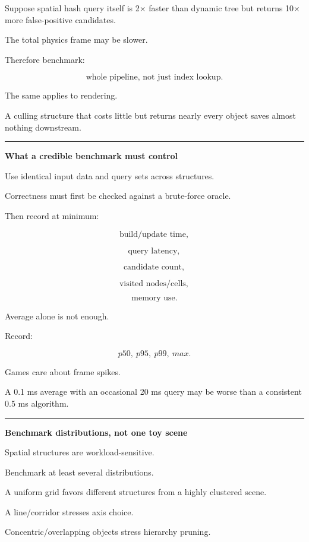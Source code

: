 Suppose spatial hash query itself is 2× faster than dynamic tree but returns 10× more false-positive candidates.

The total physics frame may be slower.

Therefore benchmark:

\[
\boxed{
\text{whole pipeline, not just index lookup}.
}
\]

The same applies to rendering.

A culling structure that costs little but returns nearly every object saves almost nothing downstream.

\begin{center}\rule{0.5\linewidth}{0.5pt}\end{center}

\textbf{What a credible benchmark must control}

Use identical input data and query sets across structures.

Correctness must first be checked against a brute-force oracle.

Then record at minimum:

\[
\text{build/update time},
\]

\[
\text{query latency},
\]

\[
\text{candidate count},
\]

\[
\text{visited nodes/cells},
\]

\[
\text{memory use}.
\]

Average alone is not enough.

Record:

\[
p50,\ p95,\ p99,\ max.
\]

Games care about frame spikes.

A 0.1 ms average with an occasional 20 ms query may be worse than a consistent 0.5 ms algorithm.

\begin{center}\rule{0.5\linewidth}{0.5pt}\end{center}

\textbf{Benchmark distributions, not one toy scene}

Spatial structures are workload-sensitive.

Benchmark at least several distributions.

A uniform grid favors different structures from a highly clustered scene.

A line/corridor stresses axis choice.

Concentric/overlapping objects stress hierarchy pruning.


